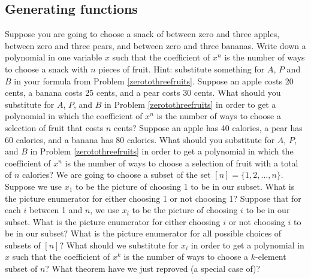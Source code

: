 \subsection{Generating functions}
\bp 
\iteme Suppose you are going to choose a snack of between zero and three
apples, between zero and three pears, and between zero and three
bananas.  Write down a polynomial in one variable $x$ such that the
coefficient of $x^n$ is the number of ways to choose a snack with $n$
pieces of fruit.  Hint:  substitute something for $A$, $P$ and $B$ in
your formula from Problem \ref{zerotothreefruits}.
\itemm Suppose an apple costs 20 cents, a banana costs 25 cents, and a
pear costs 30 cents.  What should you substitute for $A$, $P$, and $B$ in
Problem \ref{zerotothreefruits} in order to get a polynomial in which the
coefficient of $x^n$ is the number of ways to choose a selection of fruit
that costs $n$ cents?
\iteme Suppose an apple has 40 calories, a pear has 60 calories, and a
banana has 80 calories.  What should you substitute for $A$, $P$, and $B$ 
in Problem \ref{zerotothreefruits} in order to get a polynomial in which
the coefficient of $x^n$ is the number of ways to choose a selection of
fruit with a total of $n$ calories?
\iteme We are going to choose a subset of the set $[n]=\{1,2,\ldots,
n\}$.  Suppose we use $x_1$ to be the picture of choosing 1 to be in our
subset.  What is the picture enumerator for either choosing 1 or not
choosing 1?  Suppose that for each $i$ between 1 and $n$, we use $x_i$ to
be the picture of choosing
$i$ to be in our subset.  What is the picture enumerator for either
choosing $i$ or not choosing $i$ to be in our subset?  What is the
picture enumerator for all possible choices of subsets of $[n]$?  What
should we substitute for $x_i$ in order to get a polynomial in $x$ such
that the coefficient of $x^k$ is the number of ways to choose a
$k$-element subset of $n$?  What theorem have we just
reproved (a special case of)?\label{reprovingbinomialtheorem}
